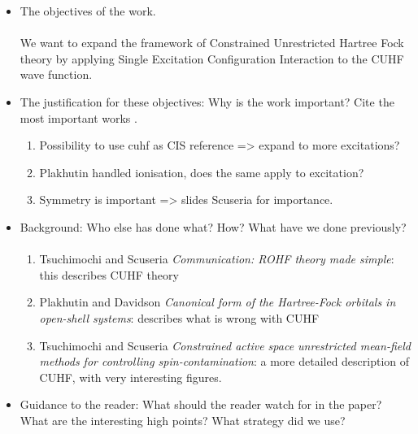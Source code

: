 \documentclass[twoside,twocolumn,9pt]{article}
\begin{document}
\begin{itemize}
    \item The objectives of the work. 
    \paragraph*{}
    We want to expand the framework of Constrained Unrestricted Hartree Fock theory by applying Single Excitation Configuration 
    Interaction to the CUHF wave function.
    \item The justification for these objectives: Why is the work important? Cite the most important works \cite{whitesides2004a}.
    \begin{enumerate}
      \item Possibility to use cuhf as CIS reference => expand to more excitations?
      \item Plakhutin handled ionisation, does the same apply to excitation?
      \item Symmetry is important => slides Scuseria for importance.
    \end{enumerate}
    \item Background: Who else has done what? How? What have we done previously?
    \paragraph*{}
    \begin{enumerate}
      \item Tsuchimochi and Scuseria \textit{Communication: ROHF theory made simple}: this describes CUHF theory
      \item Plakhutin and Davidson \textit{Canonical form of the Hartree-Fock orbitals in open-shell systems}: describes what is wrong with CUHF
      \item Tsuchimochi and Scuseria \textit{Constrained active space unrestricted mean-field methods for controlling spin-contamination}: a more detailed description of CUHF, with very interesting figures.
    \end{enumerate}
    \item Guidance to the reader: What should the reader watch for in the paper? What are the interesting high points? What strategy did we use?

\end{itemize}
\end{document}
